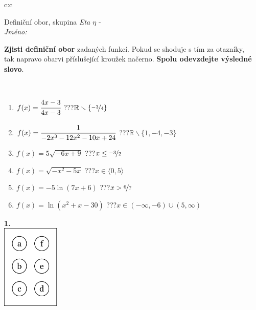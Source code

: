 \documentclass[10pt]{report}
\begin{document}
\begin{tabular}{c:c}
\begin{minipage}[c][104.5mm][t]{0.5\linewidth}
\begin{center}
\vspace{7mm}
{\huge Definiční obor, skupina \textit{Eta $\eta$} -}\\[5mm]
\textit{Jméno:}\phantom{xxxxxxxxxxxxxxxxxxxxxxxxxxxxxxxxxxxxxxxxxxxxxxxxxxxxxxxxxxxxxxxxx}\\[5mm]
\begin{minipage}{0.95\linewidth}
\begin{center}
\textbf{Zjisti definiční obor} zadaných funkcí. Pokud se shoduje s tím za otazníky,\\tak napravo obarvi příslušející kroužek načerno. \textbf{Spolu odevzdejte výsledné slovo}.
\end{center}
\end{minipage}
\\[1mm]
\begin{minipage}{0.79\linewidth}
\begin{center}
\begin{varwidth}{\linewidth}
\begin{enumerate}
\normalsizerrr
\item $f(x)=\cfrac{4x-3}{4x-3}$\quad \dotfill\; ???\;\dotfill \quad $\mathbb{R}\smallsetminus\{\nicefrac{-3}{4}\}$
\item $f(x)=\cfrac{1}{-2x^3-12x^2-10x+24}$\quad \dotfill\; ???\;\dotfill \quad $\mathbb{R}\smallsetminus\{1,-4,-3\}$
\item $f(x)=5\sqrt{-6x+9}$\quad \dotfill\; ???\;\dotfill \quad $x\leq\nicefrac{-3}{2}$
\item $f(x)=\sqrt{-x^2-5x}$\quad \dotfill\; ???\;\dotfill \quad $x\in\langle0 , 5\rangle$
\item $f(x)=-5\ln{(7x+6)}$\quad \dotfill\; ???\;\dotfill \quad $x>\nicefrac{6}{7}$
\item $f(x)=\ln{(x^2+x-30)}$\quad \dotfill\; ???\;\dotfill \quad $x\in(-\infty , -6)\cup(5 , \infty)$
\end{enumerate}
\end{varwidth}
\end{center}
\end{minipage}
\begin{minipage}{0.20\linewidth}
\begin{center}
{\Huge\bfseries 1.} \\[2mm]
\includegraphics[height=40mm]{../images/braille.png}

\end{center}
\end{minipage}
\end{center}
\end{minipage}
\end{tabular}
\end{document}
